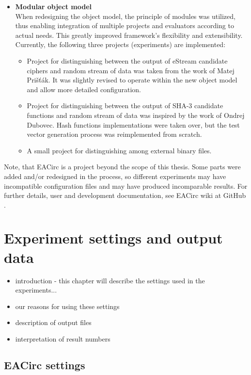\documentclass[12pt,oneside]{fithesis2}
\begin{document}
\begin{itemize}
\item \textbf{Modular object model}\\
When redesigning the object model, the principle of modules was utilized, thus enabling integration of multiple projects 
and evaluators according to actual needs. This greatly improved framework's flexibility and extensibility.
Currently, the following three projects (experiments) are implemented:
\begin{itemize}
\item Project for distinguishing between the output of eStream candidate ciphers and random stream of data was taken from the work of 
Matej Prišťák.
It was slightly revised to operate within the new object model and allow more detailed configuration.
\item Project for distinguishing between the output of SHA-3 candidate functions and random stream of data was inspired by the work of 
Ondrej Dubovec.
Hash functions implementations were taken over, but the test vector generation process was reimplemented from scratch. 
\item A small project for distinguishing among external binary files.
\end{itemize}
\end{itemize}

\noindent
Note, that EACirc is a project beyond the scope of this thesis. Some parts were added and/or redesigned in the process, so
different experiments may have incompatible configuration files and may have produced incomparable results.
For further details, user and development documentation, see EACirc wiki at GitHub \cite{eacirc-github}.	

\chapter{Experiment settings and output data}
\label{chap:settings}

\begin{itemize}
\item introduction - this chapter will describe the settings used in the experiments...
\item our reasons for using these settings
\item description of output files
\item interpretation of result numbers
\end{itemize}

\section{EACirc settings}
\label{sec:settings-eacirc}
\end{document}
